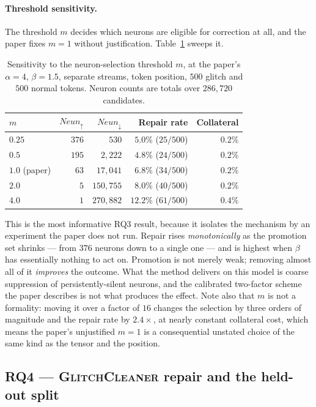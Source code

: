 \documentclass[11pt,a4paper]{article}
\newcommand{\gc}{\textsc{GlitchCleaner}}
\newcommand{\Neunup}{\ensuremath{\mathit{Neun}_{\uparrow}}}
\newcommand{\Neundown}{\ensuremath{\mathit{Neun}_{\downarrow}}}
\begin{document}
\paragraph{Threshold sensitivity.}
\label{sec:msweep}
The threshold $m$ decides which neurons are eligible for correction at all, and
the paper fixes $m = 1$ without justification. Table~\ref{tab:msweep} sweeps it.

\begin{table}[h]
\centering
\caption{Sensitivity to the neuron-selection threshold $m$, at the paper's
$\alpha = 4$, $\beta = 1.5$, separate streams, token position, $500$ glitch and
$500$ normal tokens. Neuron counts are totals over $286{,}720$ candidates.}
\label{tab:msweep}
\begin{tabular}{lrrrr}
\toprule
$m$ & \Neunup{} & \Neundown{} & Repair rate & Collateral \\
\midrule
$0.25$        & $376$ & $530$     & $5.0\%$ ($25/500$) & $0.2\%$ \\
$0.5$         & $195$ & $2{,}222$ & $4.8\%$ ($24/500$) & $0.2\%$ \\
$1.0$ (paper) & $63$  & $17{,}041$ & $6.8\%$ ($34/500$) & $0.2\%$ \\
$2.0$         & $5$   & $150{,}755$ & $8.0\%$ ($40/500$) & $0.2\%$ \\
$4.0$         & $1$   & $270{,}882$ & $\mathbf{12.2\%}$ ($61/500$) & $0.4\%$ \\
\bottomrule
\end{tabular}
\end{table}

This is the most informative RQ3 result, because it isolates the mechanism by an
experiment the paper does not run. Repair rises \emph{monotonically} as the
promotion set shrinks --- from $376$ neurons down to a single one --- and is
highest when $\beta$ has essentially nothing to act on. Promotion is not merely
weak; removing almost all of it \emph{improves} the outcome. What the method
delivers on this model is coarse suppression of persistently-silent neurons, and
the calibrated two-factor scheme the paper describes is not what produces the
effect. Note also that $m$ is not a formality: moving it over a factor of $16$
changes the selection by three orders of magnitude and the repair rate by
$2.4\times$, at nearly constant collateral cost, which means the paper's
unjustified $m = 1$ is a consequential unstated choice of the same kind as the
tensor and the position.

\subsection{RQ4 --- \gc{} repair and the held-out split}
\label{sec:rq4}
\end{document}
